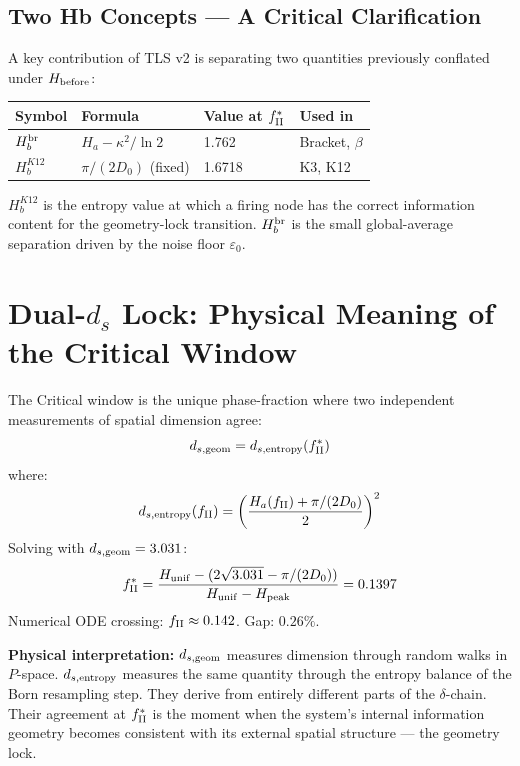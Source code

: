 \documentclass[12pt, a4paper]{article}
\begin{document}
\subsection{Two Hb Concepts --- A Critical Clarification}

A key contribution of TLS v2 is separating two quantities previously conflated under $H_{\rm before}$:

\begin{center}
\renewcommand{\arraystretch}{1.3}
\begin{tabular}{p{2.5cm} p{4cm} p{2.2cm} p{3cm}}
\toprule
\textbf{Symbol} & \textbf{Formula} & \textbf{Value at $f_{\rm II}^*$} & \textbf{Used in} \\
\midrule
$H_b^{\rm br}$ & $H_a - \kappa^2/\ln 2$ & 1.762 & Bracket, $\beta$ \\
$H_b^{K12}$ & $\pi/(2D_0)$ (fixed) & 1.6718 & K3, K12 \\
\bottomrule
\end{tabular}
\end{center}

$H_b^{K12}$ is the entropy value at which a firing node has the correct information content for the geometry-lock transition. $H_b^{\rm br}$ is the small global-average separation driven by the noise floor $\varepsilon_0$.

\section{Dual-$d_s$ Lock: Physical Meaning of the Critical Window}

\begin{keybox}[title={Dual-$d_s$ Lock Condition (Derived)}]
The Critical window is the unique phase-fraction where two independent measurements of spatial dimension agree:
\[
  d_{s,\rm geom} = d_{s,\rm entropy}(f_{\rm II}^*)
\]
where:
\[
  d_{s,\rm entropy}(f_{\rm II}) = \left(\frac{H_a(f_{\rm II}) + \pi/(2D_0)}{2}\right)^2
\]
Solving with $d_{s,\rm geom} = 3.031$:
\[
  f_{\rm II}^* = \frac{H_{\rm unif} - (2\sqrt{3.031} - \pi/(2D_0))}{H_{\rm unif} - H_{\rm peak}} = 0.1397
\]
Numerical ODE crossing: $f_{\rm II} \approx 0.142$. Gap: $0.26\%$.

\textbf{Physical interpretation:} $d_{s,\rm geom}$ measures dimension through random walks in $P$-space. $d_{s,\rm entropy}$ measures the same quantity through the entropy balance of the Born resampling step. They derive from entirely different parts of the $\delta$-chain. Their agreement at $f_{\rm II}^*$ is the moment when the system's internal information geometry becomes consistent with its external spatial structure --- the geometry lock.
\end{keybox}
\end{document}
